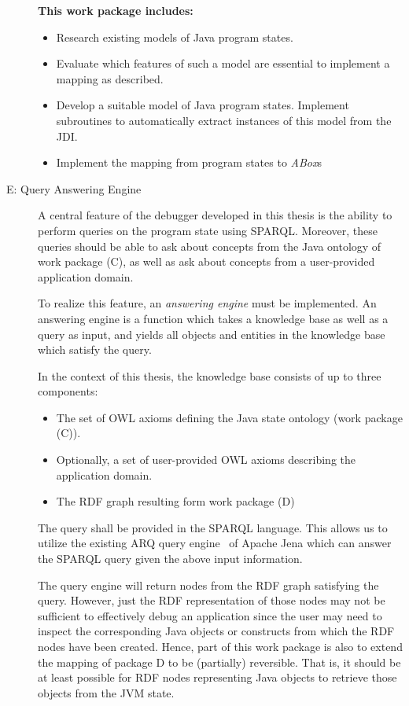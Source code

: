 \documentclass[
	english,
	accentcolor=9c,%
  marginpar=0cm %
	]{tudapub}
\begin{document}
\begin{description}
    \textbf{This work package includes:}
    \begin{itemize}
      \item Research existing models of Java program states.
      \item Evaluate which features of such a model are essential to implement
        a mapping as described.
      \item Develop a suitable model of Java program states.
        Implement subroutines to automatically extract instances of this model
        from the JDI.
      \item Implement the mapping from program states to \emph{ABox}s
    \end{itemize}
  \item[E: Query Answering Engine]
    A central feature of the debugger developed in this thesis is the ability to
    perform queries on the program state using SPARQL.
    Moreover, these queries should be able to ask about concepts from the Java
    ontology of work package (C), as well as ask about concepts from a
    user-provided application domain.

    To realize this feature, an \emph{answering engine} must be implemented.
    An answering engine is a function which takes a knowledge base as well as a
    query as input, and yields all objects and entities in the knowledge base
    which satisfy the query.

    In the context of this thesis, the knowledge base consists of up to three
    components:
    \begin{itemize}
      \item The set of OWL axioms defining the Java state ontology
        (work package (C)).
      \item Optionally, a set of user-provided OWL axioms describing the
        application domain.
      \item The RDF graph resulting form work package (D)
    \end{itemize}

    The query shall be provided in the SPARQL language.
    This allows us to utilize the existing ARQ query engine~\cite{arq} of Apache
    Jena which can answer the SPARQL query given the above input information.

    The query engine will return nodes from the RDF graph satisfying the
    query.
    However, just the RDF representation of those nodes may not be sufficient
    to effectively debug an application since the user may need to inspect the
    corresponding Java objects or constructs from which the RDF nodes
    have been created.
    Hence, part of this work package is also to extend the mapping of package
    D to be (partially) reversible.
    That is, it should be at least possible for RDF nodes representing Java
    objects to retrieve those objects from the JVM state.


\end{description}
\end{document}
